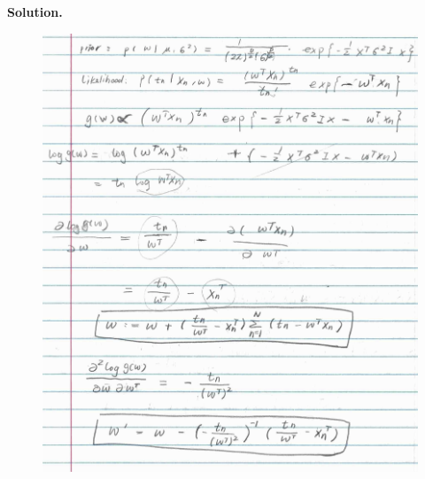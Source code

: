 \documentclass[10pt]{article}
\begin{document}
\begin{itemize}
{\bf Solution.} %
\FloatBarrier
\begin{figure}[h!]
\centering
\includegraphics[width=1\linewidth]{figures/HW4_5.jpeg}
\end{figure}
\FloatBarrier
\end{itemize}
\end{document}

